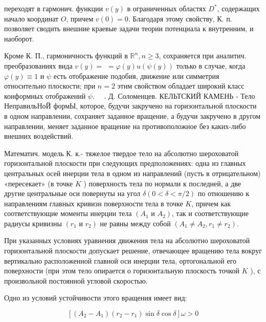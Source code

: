 \documentclass[10pt]{article}
\begin{document}
переходят в гармонич. функции $v(y)$ в ограниченных областях $D^{*}$, содержащих начало координат $O$, причем $v(0)=0$. Благодаря этому свойству, К. п. позволяет сводить внешние краевые задачи теории потенциала к внутренним, и наоборот.



Кроме К. П., гармоничность функций в $\mathbb{R}^{n}, n \geqslant 3$, сохраняется при аналитич. преобразованиях вида $v(y)=$ $=\varphi(y) u(\psi(y))$ только в случае, когда $\varphi(y) \equiv 1$ и $\psi$ есть отображение подобия, движение или симметрия относительно плоскости; при $n=2$ этим свойством обладает широкий класс конформных отображений $\psi$. $\quad$. Д. Соломенцев. КЕЛЬТСКИЙ КАМЕНЬ - Тело НеправильНоЙ формЫ, которое, будучи закручено на горизонтальной плоскости в одном направлении, сохраняет заданное вращение, а будучи закручено в другом направлении, меняет заданное вращение на противоположное без каких-либо внешних воздействий.



Математич. модель К. к.- тяжелое твердое тело на абсолютно шероховатой горизонтальной плоскости при следующих предположениях: одна из главных центральных осей инерции тела в одном из направлений (пусть в отрицательном) «пересекает» (в точке $K$ ) поверхность тела по нормали к последней, а две другие центральные оси повернуты на угол $\delta(0<\delta<\pi / 2)$ по отношению к направлениям главных кривизн поверхности тела в точке $K$, причем как соответствующие моменты инерции тела $\left(A_{1}\right.$ и $\left.A_{2}\right)$, так и соответствующие радиусы кривизны $\left(r_{1}\right.$ и $\left.r_{2}\right)$ не равны между собой $\left(A_{1} \neq A_{2}, r_{1} \neq r_{2}\right)$.



При указанных условиях уравнения движения тела на абсолютно шероховатой горизонтальной плоскости допускает решение, отвечающее вращению тела вокруг вертикально расположенной главной оси инерции тела, ортогональной его поверхности (при этом тело опирается о горизонтальную плоскость точкой $K$ ), с произвольной постоянной угловой скоростью.



Одно из условий устойчивости этого вращения имеет вид:



\[

\left[\left(A_{2}-A_{1}\right)\left(r_{2}-r_{1}\right) \sin \delta \cos \delta\right] \omega>0

\]
\end{document}
